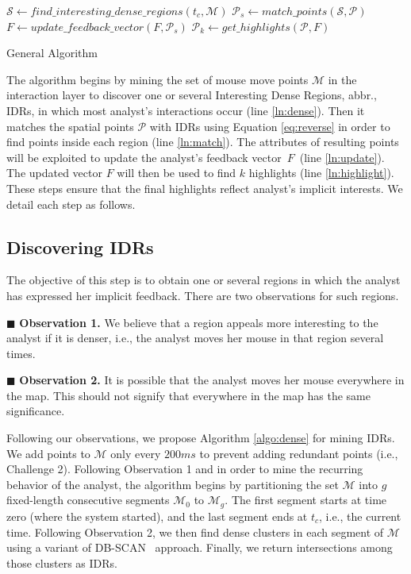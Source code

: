 \documentclass[sigconf,edbt]{acmart-edbt2019}
\begin{document}
\begin{algorithm}[t]
\DontPrintSemicolon
{}
$\mathcal{S} \gets \mathit{find\_interesting\_dense\_regions}(t_c,\mathcal{M})$\label{ln:dense}\;
$\mathcal{P}_s \gets \mathit{match\_points}(\mathcal{S}, \mathcal{P})$\label{ln:match}\;
$F \gets \mathit{update\_feedback\_vector}(F, \mathcal{P}_s)$\label{ln:update}\;
$\mathcal{P}_k \gets \mathit{get\_highlights}(\mathcal{P}, F)$\label{ln:highlight}\;
\; 
\caption{{\sc General} Algorithm}
\label{algo:main}
\end{algorithm}

\vspace{2pt}
The algorithm begins by mining the set of mouse move points $\mathcal{M}$ in the interaction layer to discover one or several Interesting Dense Regions, abbr., IDRs, in which most analyst's interactions occur (line \ref{ln:dense}). Then it matches the spatial points $\mathcal{P}$ with IDRs using Equation \ref{eq:reverse} in order to find points inside each region (line \ref{ln:match}). The attributes of resulting points will be exploited to update the analyst's feedback vector~$F$~(line \ref{ln:update}). The updated vector $F$ will then be used to find $k$ highlights (line \ref{ln:highlight}). These steps ensure that the final highlights reflect analyst's implicit interests. We detail each step as follows.

\subsection{Discovering IDRs}
The objective of this step is to obtain one or several regions in which the analyst has expressed her implicit feedback. There are two observations for such regions.

\vspace{2pt}
\noindent $\blacksquare$ {\bf Observation 1.} We believe that a region appeals more interesting to the analyst if it is denser, i.e., the analyst moves her mouse in that region several times.

\vspace{2pt}
\noindent $\blacksquare$ {\bf Observation 2.} It is possible that the analyst moves her mouse everywhere in the map. This should not signify that everywhere in the map has the same significance.

\vspace{2pt}
Following our observations, we propose Algorithm \ref{algo:dense} for mining IDRs. We add points to $\mathcal{M}$ only every $200ms$ to prevent adding redundant points (i.e., Challenge 2).  Following Observation 1 and in order to mine the recurring behavior of the analyst, the algorithm begins by partitioning the set $\mathcal{M}$ into $g$ fixed-length consecutive segments $\mathcal{M}_0$ to $\mathcal{M}_g$. The first segment starts at time zero (where the system started), and the last segment ends at $t_c$, i.e., the current time. Following Observation 2, we then find dense clusters in each segment of $\mathcal{M}$ using a variant of DB-SCAN~\cite{Ester:1996} approach. Finally, we return intersections among those clusters as IDRs.
\end{document}
